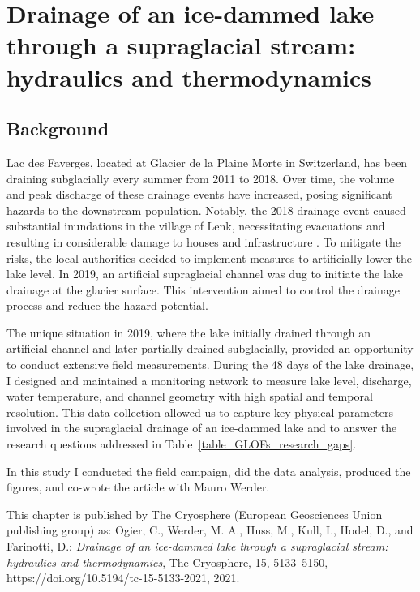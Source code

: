 \chapter{Drainage of an ice-dammed lake through a supraglacial stream: hydraulics and thermodynamics}
\label{ch:chapter_plainemorte}

\section{Background}

Lac des Faverges, located at Glacier de la Plaine Morte in Switzerland, has been draining subglacially every summer from 2011 to 2018. Over time, the volume and peak discharge of these drainage events have increased, posing significant hazards to the downstream population. Notably, the 2018 drainage event caused substantial inundations in the village of Lenk, necessitating evacuations and resulting in considerable damage to houses and infrastructure \citep{GemeindeLenk2019}. To mitigate the risks, the local authorities decided to implement measures to artificially lower the lake level. In 2019, an artificial supraglacial channel was dug to initiate the lake drainage at the glacier surface. This intervention aimed to control the drainage process and reduce the hazard potential. 
%

The unique situation in 2019, where the lake initially drained through an artificial channel and later partially drained subglacially, provided an opportunity to conduct extensive field measurements. During the 48 days of the lake drainage, I designed and maintained a monitoring network to measure lake level, discharge, water temperature, and channel geometry with high spatial and temporal resolution. This data collection allowed us to capture key physical parameters involved in the supraglacial drainage of an ice-dammed lake and to answer the research questions addressed in Table~\ref{table_GLOFs_research_gaps}.
%

In this study I conducted the field campaign, did the data analysis, produced the figures, and co-wrote the article with Mauro Werder.
%

This chapter is published by The Cryosphere (European Geosciences Union publishing
group) as: Ogier, C., Werder, M. A., Huss, M., Kull, I., Hodel, D., and Farinotti, D.: \textit{Drainage of an ice-dammed lake through a supraglacial stream: hydraulics and thermodynamics}, The Cryosphere, 15, 5133–5150, https://doi.org/10.5194/tc-15-5133-2021, 2021.

